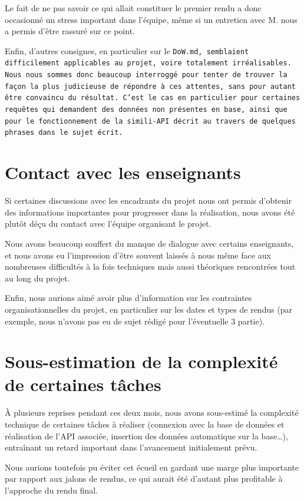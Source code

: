 \documentclass[a4paper, 11pt, twoside]{book}
\begin{document}
Le fait de ne pas savoir ce qui allait constituer le premier rendu a donc occasionné un stress important dans l'équipe, même si un entretien avec M.  nous a permis d'être rassuré sur ce point.

Enfin, d'autres consignes, en particulier sur le \tt{DoW.md}, semblaient difficilement applicables au projet, voire totalement irréalisables. Nous nous sommes donc beaucoup interroggé pour tenter de trouver la façon la plus judicieuse de répondre à ces attentes, sans pour autant être convaincu du résultat. C'est le cas en particulier pour certaines requêtes  qui demandent des données non présentes en base, ainsi que pour le fonctionnement de la simili-API  décrit au travers de quelques phrases dans le sujet écrit.

\section{Contact avec les enseignants}

Si certaines discussions avec les encadrants du projet nous ont permis d'obtenir des informations importantes pour progresser dans la réalisation, nous avons été plutôt déçu du contact avec l'équipe organisant le projet.

Nous avons beaucoup souffert du manque de dialogue avec certains enseignants, et nous avons eu l'impression d'être souvent laissés à nous même face aux nombreuses difficultés à la fois techniques mais aussi théoriques rencontrées tout au long du projet.

Enfin, nous aurions aimé avoir plus d'information sur les contraintes organisationnelles du projet, en particulier sur les dates et types de rendus (par exemple, nous n'avons pas eu de sujet rédigé pour l'éventuelle 3 partie).

\section{Sous-estimation de la complexité de certaines tâches}

 \`A plusieurs reprises pendant ces deux mois, nous avons sous-estimé la complexité technique de certaines tâches à réaliser (connexion avec la base de données  et réalisation de l'API associée, insertion des données automatique sur la base\ldots{}), entraînant un retard important dans l'avancement initialement prévu.

 Nous aurions toutefois pu éviter cet écueil en gardant une marge plus importante par rapport aux jalons de rendus, ce qui aurait été d'autant plus profitable à l'approche du rendu final.
\end{document}
